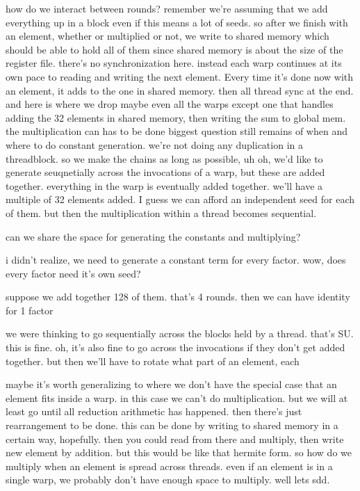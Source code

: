 how do we interact between rounds?
remember we're assuming that we add everything up in a block even if this means a lot of seeds. 
so after we finish with an element, whether or multiplied or not, we write to shared memory which should be able to hold all of them since shared memory is about the size of the register file. there's no synchronization here. instead each warp continues at its own pace to reading and writing the next element.
Every time it's done now with an element, it adds to the one in shared memory. then all thread sync at the end.
and here is where we drop maybe even all the warps except one that handles adding the 32 elements in shared memory, then writing the sum to global mem. 
the multiplication can has to be done 
biggest question still remains of when and where to do constant generation. we're not doing any duplication in a threadblock. so we make the chains as long as possible, 
uh oh, we'd like to generate seuqnetially across the invocations of a warp, but these are added together. everything in the warp is eventually added together. we'll have a multiple of 32 elements added. I guess we can afford an independent seed for each of them. but then the multiplication within a thread becomes sequential.

can we share the space for generating the constants and multiplying?

i didn't realize, we need to generate a constant term for every factor.
wow, does every factor need it's own seed? 

suppose we add together 128 of them. that's 4 rounds.
then we can have identity for 1 factor 

we were thinking to go sequentially across the blocks held by a thread. that's SU. this is fine. 
oh, it's also fine to go across the invocations if they don't get added together. 
but then we'll have to rotate what part of an element, each 

maybe it's worth generalizing to where we don't have the special case that an element fits inside a warp. in this case we can't do multiplication. but we will at least go until all reduction arithmetic has happened. then there's just rearrangement to be done. this can be done by writing to shared memory in a certain way, hopefully.
then you could read from there and multiply, then write new element by addition. 
but this would be like that hermite form.
so how do we multiply when an element is spread across threads. 
even if an element is in a single warp, we probably don't have enough space to multiply. well lets sdd. 



